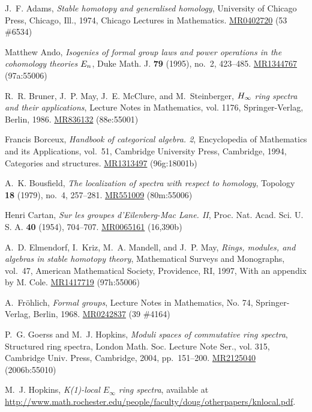 \documentclass{gtpart}
\theoremstyle{definition}
\theoremstyle{remark}
\begin{document}
\newcommand{\MRn}[2]{\href{http://www.ams.org/mathscinet-getitem?mr=#1}{MR#1} #2}
\begin{thebibliography}

J.~F. Adams, \emph{Stable homotopy and generalised homology}, University of
  Chicago Press, Chicago, Ill., 1974, Chicago Lectures in Mathematics.
  \MRn{0402720}{(53 \#6534)}

Matthew Ando, \emph{Isogenies of formal group laws and power operations in the
  cohomology theories {$E\sb n$}}, Duke Math. J. \textbf{79} (1995), no.~2,
  423--485. \MRn{1344767}{(97a:55006)}

R.~R. Bruner, J.~P. May, J.~E. McClure, and M.~Steinberger, \emph{{$H\sb \infty
  $} ring spectra and their applications}, Lecture Notes in Mathematics, vol.
  1176, Springer-Verlag, Berlin, 1986. \MRn{836132}{(88e:55001)}

Francis Borceux, \emph{Handbook of categorical algebra. 2}, Encyclopedia of
  Mathematics and its Applications, vol.~51, Cambridge University Press,
  Cambridge, 1994, Categories and structures. \MRn{1313497}{(96g:18001b)}

A.~K. Bousfield, \emph{The localization of spectra with respect to homology},
  Topology \textbf{18} (1979), no.~4, 257--281. \MRn{551009}{(80m:55006)}

Henri Cartan, \emph{Sur les groupes d'{E}ilenberg-{M}ac {L}ane. {II}}, Proc.
  Nat. Acad. Sci. U. S. A. \textbf{40} (1954), 704--707. \MRn{0065161}{(16,390b)}

A.~D. Elmendorf, I.~Kriz, M.~A. Mandell, and J.~P. May, \emph{Rings, modules,
  and algebras in stable homotopy theory}, Mathematical Surveys and Monographs,
  vol.~47, American Mathematical Society, Providence, RI, 1997, With an
  appendix by M. Cole. \MRn{1417719}{(97h:55006)}

A.~Fr{\"o}hlich, \emph{Formal groups}, Lecture Notes in Mathematics, No. 74,
  Springer-Verlag, Berlin, 1968. \MRn{0242837}{(39 \#4164)}

P.~G. Goerss and M.~J. Hopkins, \emph{Moduli spaces of commutative ring
  spectra}, Structured ring spectra, London Math. Soc. Lecture Note Ser., vol.
  315, Cambridge Univ. Press, Cambridge, 2004, pp.~151--200. \MRn{2125040}{(2006b:55010)}

M.~J. Hopkins, \emph{K(1)-local ${E}_\infty$ ring spectra}, available at
  \href{http://www.math.rochester.edu/people/faculty/doug/otherpapers/knlocal.pdf}{http://www.math.rochester.edu/people/faculty/doug/otherpapers/knlocal.pdf}.


\end{thebibliography}
\end{document}
